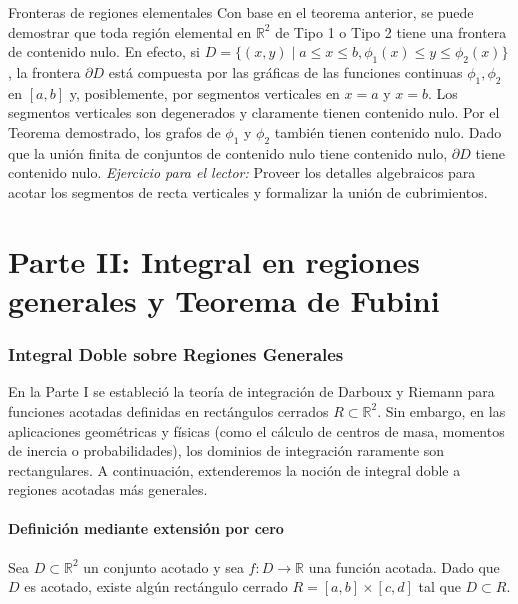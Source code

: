 \documentclass[11pt,a4paper]{article}
\begin{document}
\begin{ejerciciobox}{Fronteras de regiones elementales}
Con base en el teorema anterior, se puede demostrar que toda región elemental en $\mathbb{R}^2$ de Tipo 1 o Tipo 2 tiene una frontera de contenido nulo. 
En efecto, si $D = \{ (x,y) \mid a \leq x \leq b, \phi_1(x) \leq y \leq \phi_2(x) \}$, la frontera $\partial D$ está compuesta por las gráficas de las funciones continuas $\phi_1, \phi_2$ en $[a,b]$ y, posiblemente, por segmentos verticales en $x=a$ y $x=b$.
Los segmentos verticales son degenerados y claramente tienen contenido nulo. Por el Teorema demostrado, los grafos de $\phi_1$ y $\phi_2$ también tienen contenido nulo. Dado que la unión finita de conjuntos de contenido nulo tiene contenido nulo, $\partial D$ tiene contenido nulo. 
\textit{Ejercicio para el lector:} Proveer los detalles algebraicos para acotar los segmentos de recta verticales y formalizar la unión de cubrimientos.
\end{ejerciciobox}
\part*{Parte II: Integral en regiones generales y Teorema de Fubini}

\section{Integral Doble sobre Regiones Generales}

En la Parte I se estableció la teoría de integración de Darboux y Riemann para funciones acotadas definidas en rectángulos cerrados $R \subset \mathbb{R}^2$. Sin embargo, en las aplicaciones geométricas y físicas (como el cálculo de centros de masa, momentos de inercia o probabilidades), los dominios de integración raramente son rectangulares. A continuación, extenderemos la noción de integral doble a regiones acotadas más generales.

\subsection{Definición mediante extensión por cero}

Sea $D \subset \mathbb{R}^2$ un conjunto acotado y sea $f: D \to \mathbb{R}$ una función acotada. Dado que $D$ es acotado, existe algún rectángulo cerrado $R = [a,b] \times [c,d]$ tal que $D \subset R$. 
\end{document}
